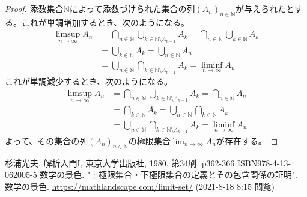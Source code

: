 \documentclass[dvipdfmx]{jsarticle}
\begin{document}
\begin{proof}
添数集合$\mathbb{N}$によって添数づけられた集合の列$\left( A_{n} \right)_{n \in \mathbb{N}}$が与えられたとする。これが単調増加するとき、次のようになる。
\begin{align*}
\limsup_{n \rightarrow \infty}A_{n} &= \bigcap_{n \in \mathbb{N}} {\bigcup_{k \in \mathbb{N} \setminus \varLambda_{n - 1}} A_{k}} = \bigcap_{n \in \mathbb{N}} {\bigcup_{k \in \mathbb{N}} A_{k}}\\
&= \bigcup_{k \in \mathbb{N}} A_{k} = \bigcup_{n \in \mathbb{N}} A_{n}\\
&= \bigcup_{n \in \mathbb{N}} {\bigcap_{k \in \mathbb{N} \setminus \varLambda_{n - 1}} A_{k}} = \liminf_{n \rightarrow \infty}A_{n}
\end{align*}
これが単調減少するとき、次のようになる。
\begin{align*}
\limsup_{n \rightarrow \infty}A_{n} &= \bigcap_{n \in \mathbb{N}} {\bigcup_{k \in \mathbb{N} \setminus \varLambda_{n - 1}} A_{k}} = \bigcap_{n \in \mathbb{N}} A_{n}\\
&= \bigcap_{k \in \mathbb{N}} A_{k} = \bigcup_{n \in \mathbb{N}} {\bigcap_{k \in \mathbb{N}} A_{k}}\\
&= \bigcup_{n \in \mathbb{N}} {\bigcap_{k \in \mathbb{N} \setminus \varLambda_{n - 1}} A_{k}} = \liminf_{n \rightarrow \infty}A_{n}
\end{align*}
よって、その集合の列$\left( A_{n} \right)_{n \in \mathbb{N}}$の極限集合$\lim_{n \rightarrow \infty}A_{n}$が存在する。
\end{proof}
\begin{thebibliography}{50}
  杉浦光夫, 解析入門I, 東京大学出版社, 1980, 第34刷. p362-366 ISBN978-4-13-062005-5
  数学の景色. "上極限集合・下極限集合の定義とその包含関係の証明". 数学の景色. \url{https://mathlandscape.com/limit-set/} (2021-8-18 8:15 閲覧)
\end{thebibliography}
\end{document}
